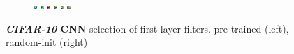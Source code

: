 \documentclass{article}
\begin{document}
\begin{figure}
\begin{subfigure}{.4\linewidth}
              \includegraphics[width=0.1\linewidth]{../graphics/cifar_filters/random_13.png} %
              \includegraphics[width=0.1\linewidth]{../graphics/cifar_filters/random_14.png} %
              \includegraphics[width=0.1\linewidth]{../graphics/cifar_filters/random_15.png}
              \includegraphics[width=0.1\linewidth]{../graphics/cifar_filters/random_16.png} %
              \includegraphics[width=0.1\linewidth]{../graphics/cifar_filters/random_17.png} %
              \includegraphics[width=0.1\linewidth]{../graphics/cifar_filters/random_18.png}
            \end{subfigure}

          \caption{\textbf{\emph{CIFAR-10} CNN} selection of first layer filters. pre-trained (left), random-init (right)}
          \label{fig:cifar_filters}

      \end{figure}
\end{document}
